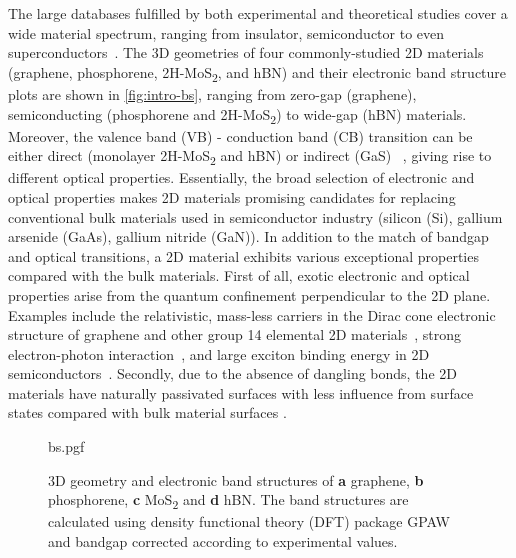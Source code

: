 The large databases fulfilled by both
experimental and theoretical studies cover a wide material spectrum,
ranging from insulator, semiconductor to even
superconductors~\cite{Novoselov_2016_vdW}.
%
The 3D geometries of four commonly-studied 2D materials (graphene,
phosphorene, 2H-MoS\textsubscript{2}, and hBN) and their electronic
band structure plots are shown in \autoref{fig:intro-bs}, ranging from
zero-gap (graphene), semiconducting (phosphorene and
2H-MoS\textsubscript{2}) to wide-gap (hBN) materials.
%
Moreover, the valence band (VB) - conduction band (CB) transition can
be either direct (monolayer 2H-MoS\textsubscript{2} and hBN) or
indirect (GaS) ~\cite{Xia_2014}, giving rise to different
optical properties.
%
Essentially, the broad selection of electronic and optical properties
makes 2D materials promising candidates for replacing conventional
bulk materials used in semiconductor industry (\eg silicon (Si),
gallium arsenide (GaAs), gallium nitride (GaN)).
%
In addition to the match of bandgap and optical transitions, a 2D
material exhibits various exceptional properties compared with the bulk materials.
%
First of all, exotic electronic and optical properties arise from the
quantum confinement perpendicular to the 2D
plane.
%
Examples include the relativistic, mass-less carriers in the Dirac
cone electronic structure of graphene and other group 14 elemental 2D
materials~\cite{Novoselov_2005_massless,Zhang_2005_QHE,Das_sarma_2011_gr_electr},
strong electron-photon
interaction~\nocite{Nair_2008_transparent,Eda_2013_rev_opt}, and large
exciton binding energy in 2D
semiconductors~\cite{Mak_2010_mos2,Arnaud_2006_exc_hBN}.
%
Secondly, due to the absence of dangling bonds, the 2D materials have
naturally passivated surfaces with less influence from surface states
compared with bulk material surfaces
\cite{Novoselov_2016_vdW,Liu_2016_rev}.


\begin{figure}[htbp]
  \centering
  {bs.pgf}
  \caption{\label{fig:intro-bs} %
    3D geometry and electronic band structures of \textbf{a} graphene,
    \textbf{b} phosphorene, \textbf{c} MoS\textsubscript{2} and
    \textbf{d} hBN. The band structures are calculated using density
    functional theory (DFT) package GPAW~\cite{Mortensen_2005_gpaw}
    and bandgap corrected according to experimental values.}
\end{figure}

